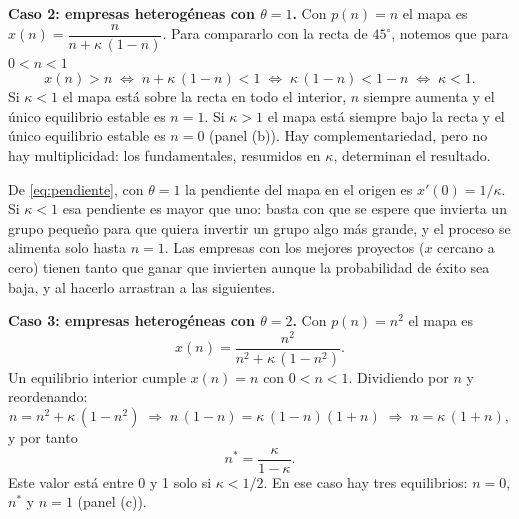 \documentclass[12pt,letterpaper]{article}
\begin{document}
\textbf{Caso 2: empresas heterogéneas con $\theta=1$.} Con $p(n)=n$ el mapa es $x(n)=\dfrac{n}{n+\kappa\,(1-n)}$. Para compararlo con la recta de $45^{\circ}$, notemos que para $0<n<1$
\[
  x(n)>n\;\Longleftrightarrow\;n+\kappa\,(1-n)<1\;\Longleftrightarrow\;\kappa\,(1-n)<1-n\;\Longleftrightarrow\;\kappa<1 .
\]
Si $\kappa<1$ el mapa está sobre la recta en todo el interior, $n$ siempre aumenta y el único equilibrio estable es $n=1$. Si $\kappa>1$ el mapa está siempre bajo la recta y el único equilibrio estable es $n=0$ (panel (b)). Hay complementariedad, pero no hay multiplicidad: los fundamentales, resumidos en $\kappa$, determinan el resultado.

\begin{intuicion}
De \eqref{eq:pendiente}, con $\theta=1$ la pendiente del mapa en el origen es $x'(0)=1/\kappa$. Si $\kappa<1$ esa pendiente es mayor que uno: basta con que se espere que invierta un grupo pequeño para que quiera invertir un grupo algo más grande, y el proceso se alimenta solo hasta $n=1$. Las empresas con los mejores proyectos ($x$ cercano a cero) tienen tanto que ganar que invierten aunque la probabilidad de éxito sea baja, y al hacerlo arrastran a las siguientes.
\end{intuicion}

\textbf{Caso 3: empresas heterogéneas con $\theta=2$.} Con $p(n)=n^{2}$ el mapa es
\[
  x(n)=\frac{n^{2}}{n^{2}+\kappa\,(1-n^{2})} .
\]
Un equilibrio interior cumple $x(n)=n$ con $0<n<1$. Dividiendo por $n$ y reordenando:
\[
  n=n^{2}+\kappa\,(1-n^{2})
  \;\Longrightarrow\;
  n\,(1-n)=\kappa\,(1-n)(1+n)
  \;\Longrightarrow\;
  n=\kappa\,(1+n),
\]
y por tanto
\begin{equation}\label{eq:nstar}
  n^*=\frac{\kappa}{1-\kappa} .
\end{equation}
Este valor está entre 0 y 1 solo si $\kappa<1/2$. En ese caso hay tres equilibrios: $n=0$, $n^*$ y $n=1$ (panel (c)).
\end{document}
